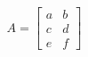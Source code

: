 \documentclass[preview]{standalone}
\begin{document}
\begin{align*}
A = \begin{bmatrix} a & b \\ c & d \\ e & f \end{bmatrix}
\end{align*}
\end{document}
